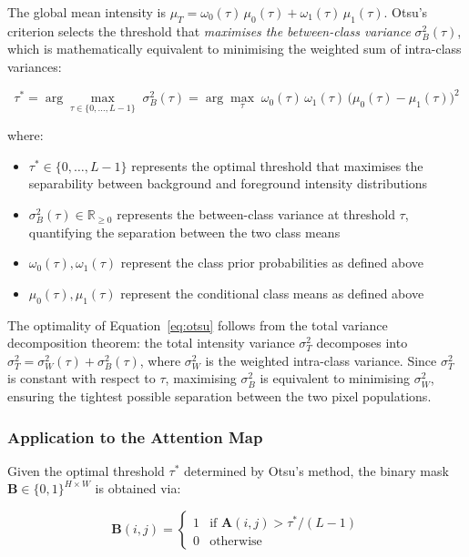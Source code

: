 The global mean intensity is $\mu_T = \omega_0(\tau)\,\mu_0(\tau) + \omega_1(\tau)\,\mu_1(\tau)$. Otsu's criterion selects the threshold that \textit{maximises the between-class variance} $\sigma_B^2(\tau)$, which is mathematically equivalent to minimising the weighted sum of intra-class variances:

\begin{equation}
\label{eq:otsu}
\tau^{*} = \arg\max_{\tau \in \{0, \ldots, L-1\}} \; \sigma_B^2(\tau) = \arg\max_{\tau} \; \omega_0(\tau)\,\omega_1(\tau)\,\bigl(\mu_0(\tau) - \mu_1(\tau)\bigr)^2
\end{equation}

where:
\begin{itemize}
\item $\tau^{*} \in \{0, \ldots, L-1\}$ represents the optimal threshold that maximises the separability between background and foreground intensity distributions
\item $\sigma_B^2(\tau) \in \mathbb{R}_{\geq 0}$ represents the between-class variance at threshold $\tau$, quantifying the separation between the two class means
\item $\omega_0(\tau), \omega_1(\tau)$ represent the class prior probabilities as defined above
\item $\mu_0(\tau), \mu_1(\tau)$ represent the conditional class means as defined above
\end{itemize}

The optimality of Equation~\ref{eq:otsu} follows from the total variance decomposition theorem: the total intensity variance $\sigma_T^2$ decomposes into $\sigma_T^2 = \sigma_W^2(\tau) + \sigma_B^2(\tau)$, where $\sigma_W^2$ is the weighted intra-class variance. Since $\sigma_T^2$ is constant with respect to $\tau$, maximising $\sigma_B^2$ is equivalent to minimising $\sigma_W^2$, ensuring the tightest possible separation between the two pixel populations.

\subsubsection{Application to the Attention Map}

Given the optimal threshold $\tau^{*}$ determined by Otsu's method, the binary mask $\mathbf{B} \in \{0, 1\}^{H \times W}$ is obtained via:

\begin{equation}
\mathbf{B}(i,j) = \begin{cases} 1 & \text{if } \mathbf{A}(i,j) > \tau^{*} / (L-1) \\ 0 & \text{otherwise} \end{cases}
\end{equation}

